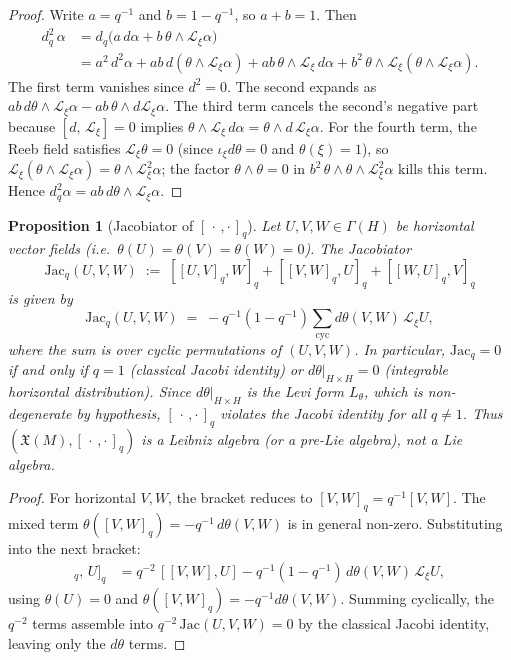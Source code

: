 \documentclass[12pt,a4paper]{report}
\newtheorem{proposition}[theorem]{Proposition}
\begin{document}
\begin{proof}
Write $a = q^{-1}$ and $b = 1 - q^{-1}$, so $a + b = 1$.  Then
\begin{align*}
  d_q^2\,\alpha
  &= d_q\bigl(a\,d\alpha + b\,\theta \wedge \mathcal{L}_\xi\alpha\bigr) \\
  &= a^2\,d^2\alpha
     + ab\,d(\theta \wedge \mathcal{L}_\xi\alpha)
     + ab\,\theta \wedge \mathcal{L}_\xi\,d\alpha
     + b^2\,\theta \wedge \mathcal{L}_\xi(\theta \wedge \mathcal{L}_\xi\alpha).
\end{align*}
The first term vanishes since $d^2 = 0$.  The second expands as
$ab\,d\theta \wedge \mathcal{L}_\xi\alpha
- ab\,\theta \wedge d\mathcal{L}_\xi\alpha$.
The third term cancels the second's negative part because
$[d,\, \mathcal{L}_\xi] = 0$ implies
$\theta \wedge \mathcal{L}_\xi\,d\alpha
= \theta \wedge d\,\mathcal{L}_\xi\alpha$.
For the fourth term, the Reeb field satisfies
$\mathcal{L}_\xi\theta = 0$ (since $\iota_\xi d\theta = 0$ and
$\theta(\xi)=1$), so
$\mathcal{L}_\xi(\theta \wedge \mathcal{L}_\xi\alpha)
= \theta \wedge \mathcal{L}_\xi^2\alpha$;
the factor $\theta \wedge \theta = 0$ in $b^2\,\theta \wedge \theta
\wedge \mathcal{L}_\xi^2\alpha$ kills this term.  Hence
$d_q^2\alpha = ab\,d\theta \wedge \mathcal{L}_\xi\alpha$.
\end{proof}

\begin{proposition}[Jacobiator of ${{[\,\cdot\,,\cdot\,]}}_q$]
\label{prop:q-jacobiator}
Let $U, V, W \in \Gamma(H)$ be horizontal vector fields (i.e.\
$\theta(U) = \theta(V) = \theta(W) = 0$).  The \emph{Jacobiator}
\[
  \mathrm{Jac}_q(U,V,W)
  \;:=\; [[U,V]_q, W]_q + [[V,W]_q, U]_q + [[W,U]_q, V]_q
\]
is given by
\[
  \mathrm{Jac}_q(U,V,W)
  \;=\; -q^{-1}(1-q^{-1})\!\sum_{\mathrm{cyc}}
        d\theta(V,W)\,\mathcal{L}_\xi U,
\]
where the sum is over cyclic permutations of $(U,V,W)$.  In particular,
$\mathrm{Jac}_q = 0$ if and only if $q = 1$ (classical Jacobi identity)
or $d\theta|_{H \times H} = 0$ (integrable horizontal distribution).
Since $d\theta|_{H \times H}$ is the Levi form $L_\theta$, which is
non-degenerate by hypothesis, $[\,\cdot\,,\cdot\,]_q$ violates the Jacobi
identity for all $q \neq 1$.  Thus $(\mathfrak{X}(M), [\,\cdot\,,\cdot\,]_q)$
is a \emph{Leibniz algebra} (or a pre-Lie algebra), not a Lie algebra.
\end{proposition}

\begin{proof}
For horizontal $V, W$, the bracket reduces to $[V,W]_q = q^{-1}[V,W]$.
The mixed term $\theta([V,W]_q) = -q^{-1}\,d\theta(V,W)$ is in general
non-zero.  Substituting into the next bracket:
\begin{align*}
  [[V,W]_q,\, U]_q
  &= q^{-2}\,[[V,W],U]
    - q^{-1}(1-q^{-1})\,d\theta(V,W)\,\mathcal{L}_\xi U,
\end{align*}
using $\theta(U)=0$ and $\theta([V,W]_q) = -q^{-1}d\theta(V,W)$.
Summing cyclically, the $q^{-2}$ terms assemble into $q^{-2}\,\mathrm{Jac}(U,V,W) = 0$
by the classical Jacobi identity, leaving only the $d\theta$ terms.
\end{proof}
\end{document}
